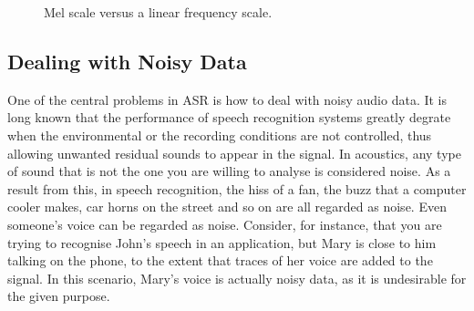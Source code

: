\begin{figure}[!ht]
        \noindent{}
        \caption{Mel scale versus a linear frequency scale.}\label{fig:mel-scale}
\end{figure}

\subsection{Dealing with Noisy Data}

One of the central problems in \ac{ASR} is how to deal with noisy audio data. It is long known that the performance of 
speech recognition systems greatly degrate when the environmental or the recording conditions are not controlled, 
thus allowing unwanted residual sounds to appear in the signal. In acoustics, any type of sound that is not the one
you are willing to analyse is considered noise. As a result from this, in speech recognition, the hiss of a fan, 
the buzz that a computer cooler makes, car horns on the street and so on are all regarded as noise. Even someone's voice
can be regarded as noise. Consider, for instance, that you are trying to recognise John's speech in an application, 
but Mary is close to him talking on the phone, to the extent that traces of her voice are added to the signal. In this
scenario, Mary's voice is actually noisy data, as it is undesirable for the given purpose. 


